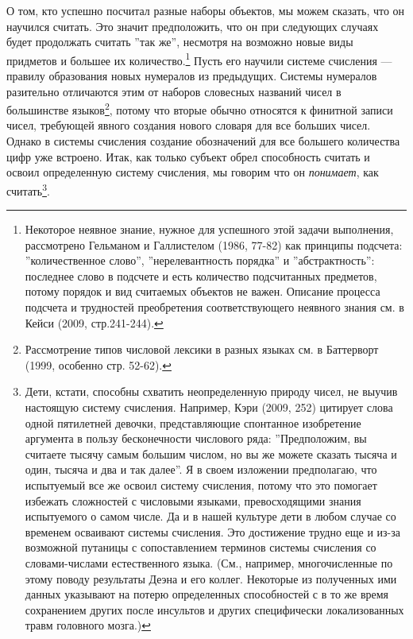 \documentclass[12pt]{book}
\begin{document}
О том, кто успешно посчитал разные наборы объектов, мы можем сказать, что он научился считать. Это значит предположить, что он при следующих случаях будет продолжать считать ''так же'', несмотря на возможно новые виды придметов и большее их количество.\footnote{Некоторое неявное знание, нужное для успешного этой задачи выполнения, рассмотрено Гельманом и Галлистелом (1986, 77-82) как принципы подсчета: ''количественное слово'', ''нерелевантность порядка'' и ''абстрактность'': последнее слово в подсчете и есть количество подсчитанных предметов, потому порядок и вид считаемых объектов не важен. Описание процесса подсчета и трудностей преобретения соответствующего неявного знания см. в Кейси (2009, стр.241-244).} Пусть его научили системе счисления --- правилу образования новых нумералов из предыдущих. Системы нумералов разительно отличаются этим от наборов словесных названий чисел в большинстве языков\footnote{Рассмотрение типов числовой лексики в разных языках см. в Баттерворт (1999, особенно стр. 52-62).}, потому что вторые обычно относятся к финитной записи чисел, требующей явного создания нового словаря для все больших чисел. Однако в системы счисления создание обозначений для все большего количества цифр уже встроено. Итак, как только субъект обрел способность считать и освоил определенную систему счисления, мы говорим что он \textit{понимает}, как считать\footnote{Дети, кстати, способны схватить неопределенную природу чисел, не выучив настоящую систему счисления. Например, Кэри (2009, 252) цитирует слова одной пятилетней девочки, представляющие спонтанное изобретение аргумента в пользу бесконечности числового ряда: ''Предположим, вы считаете тысячу самым большим числом, но вы же можете сказать тысяча и один, тысяча и два и так далее''. Я в своем изложении предполагаю, что испытуемый все же освоил систему счисления, потому что это помогает избежать сложностей с числовыми языками, превосходящими знания испытуемого о самом числе. Да и в нашей культуре дети в любом случае со временем осваивают системы счисления. Это достижение трудно еще и из-за возможной путаницы с сопоставлением терминов системы счисления со словами-числами естественного языка. (См., например, многочисленные по этому поводу результаты Деэна и его коллег. Некоторые из полученных ими данных указывают на потерю определенных способностей с в то же время сохранением других после инсультов и других специфически локализованных травм головного мозга.)}.
\end{document}

